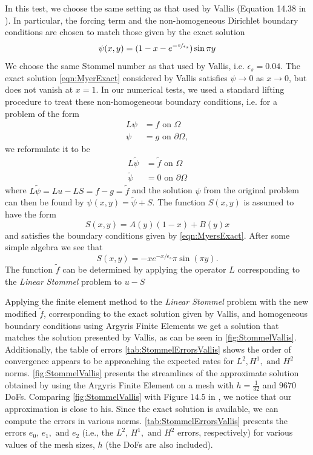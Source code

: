  In this test, we choose the same setting as that used by Vallis
(Equation 14.38 in \cite{Vallis06}).  In particular, the forcing term and the
non-homogeneous Dirichlet boundary conditions are chosen to match those given by
the exact solution
\begin{equation}
  \psi(x,y) = (1-x-e^{-\nicefrac{x}{\epsilon_s}}) \sin \pi y
  \label{eqn:MyerExact}
\end{equation}
We choose the same Stommel number as that used by Vallis, i.e.
$\epsilon_s=0.04$. The exact solution \eqref{eqn:MyerExact} considered by Vallis
satisfies $\psi \to 0$ as $x \to 0$, but does not vanish at $x=1$. In our
numerical tests, we used a standard lifting procedure to treat these
non-homogeneous boundary conditions, i.e. for a problem of the form
\begin{align*}
  L \psi&=f \text{ on } \Omega\\
  \psi &=g \text{ on } \partial \Omega,
\end{align*}
we reformulate it to be
\begin{align*}
  L\tilde{\psi} &= \tilde{f} \text{ on } \Omega \\
  \tilde{\psi} &= 0 \text{ on } \partial \Omega
\end{align*}
where $L\tilde{\psi} = Lu - LS = f - g = \tilde{f}$ and the solution $\psi$ from
the original problem can then be found by $\psi(x,y) =\tilde{\psi}+S$. The
function $S(x,y)$ is assumed to have the form
\begin{equation*}
  S(x,y) = A(y) (1-x) + B(y) x
\end{equation*}
and satisfies the boundary conditions given by \eqref{eqn:MyersExact}. After
some simple algebra we see that
\begin{equation*}
  S(x,y) = -x e^{-x/\epsilon_s}\pi \sin(\pi y).
\end{equation*}
The function $\tilde{f}$ can be determined by applying the operator $L$
corresponding to the \emph{Linear Stommel} problem to $u - S$

Applying the finite element method to the \emph{Linear Stommel} problem with the
new modified $\tilde{f}$, corresponding to the exact solution given by Vallis,
and homogeneous boundary conditions using Argyris Finite Elements we get a
solution that matches the solution presented by Vallis, as can be seen in
\autoref{fig:StommelVallis}. Additionally, the table of errors
\autoref{tab:StommelErrorsVallis} shows the order of convergence appears to be
approaching the expected rates for $L^2, H^1, \text{ and } H^2$ norms.
\autoref{fig:StommelVallis} presents the streamlines of the approximate solution
obtained by using the Argyris Finite Element on a mesh with $h=\frac{1}{32}$ and
$9670$ DoFs. Comparing \autoref{fig:StommelVallis} with Figure $14.5$ in
\cite{Vallis06}, we notice that our approximation is close to his. Since the
exact solution is available, we can compute the errors in various norms.
\autoref{tab:StommelErrorsVallis} presents the errors $e_0,\, e_1, \text{ and }
e_2$ (i.e., the $L^2,\, H^1, \text{ and } H^2$ errors, respectively) for various
values of the mesh sizes, $h$ (the DoFs are also included).

